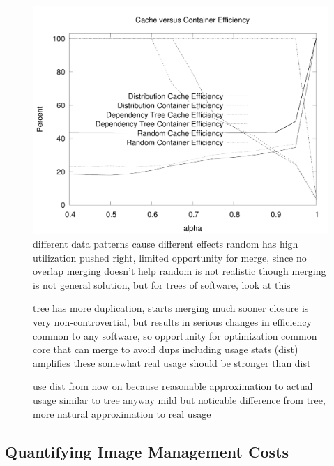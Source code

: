 \documentclass[sigconf]{acmart}
\begin{document}
\begin{figure}
\includegraphics[width=\linewidth]{curated/comparative/distribution_efficiency_comp.pdf}
different data patterns cause different effects
random has high utilization
pushed right, limited opportunity for merge, since no overlap
merging doesn't help
random is not realistic though
merging is not general solution, but for trees of software, look at this

tree has more duplication, starts merging much sooner
closure is very non-controvertial, but results in serious changes in efficiency
common to any software, so opportunity for optimization
common core that can merge to avoid dups
including usage stats (dist) amplifies these somewhat
real usage should be stronger than dist

use dist from now on because reasonable approximation to actual usage
similar to tree anyway
mild but noticable difference from tree, more natural approximation to real usage
\fi
\end{figure}

\subsection{Quantifying Image Management Costs}
\end{document}
